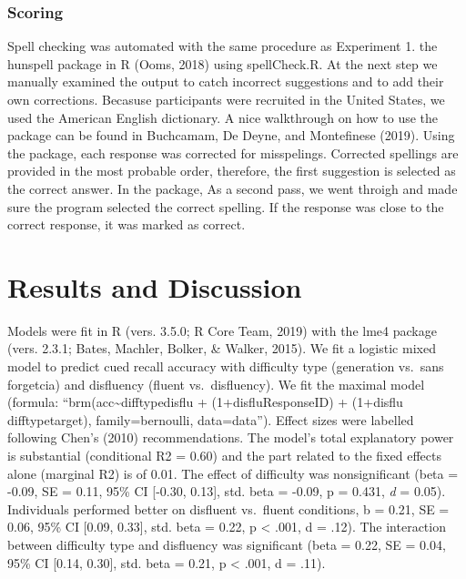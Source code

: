 \documentclass[doc]{apa6}
\begin{document}
\hypertarget{scoring}{%
\subsubsection{Scoring}\label{scoring}}

Spell checking was automated with the same procedure as Experiment 1. the hunspell package in R (Ooms, 2018) using spellCheck.R. At the next step we manually examined the output to catch incorrect suggestions and to add their own corrections. Becasuse participants were recruited in the United States, we used the American English dictionary. A nice walkthrough on how to use the package can be found in Buchcamam, De Deyne, and Montefinese (2019). Using the package, each response was corrected for misspelings. Corrected spellings are provided in the most probable order, therefore, the first suggestion is selected as the correct answer. In the package, As a second pass, we went throigh and made sure the program selected the correct spelling. If the response was close to the correct response, it was marked as correct.

\hypertarget{results-and-discussion}{%
\section{Results and Discussion}\label{results-and-discussion}}

Models were fit in R (vers. 3.5.0; R Core Team, 2019) with the lme4 package (vers. 2.3.1; Bates, Machler, Bolker, \& Walker, 2015). We fit a logistic mixed model to predict cued recall accuracy with difficulty type (generation vs.~sans forgetcia) and disfluency (fluent vs.~disfluency). We fit the maximal model (formula: \enquote{brm(acc\textasciitilde{}difftypedisflu + (1+disflu\textbar{}ResponseID) + (1+disflu difftype\textbar{}target), family=bernoulli, data=data}). Effect sizes were labelled following Chen's (2010) recommendations. The model's total explanatory power is substantial (conditional R2 = 0.60) and the part related to the fixed effects alone (marginal R2) is of 0.01. The effect of difficulty was nonsignificant (beta = -0.09, SE = 0.11, 95\% CI {[}-0.30, 0.13{]}, std. beta = -0.09, p = 0.431, \emph{d} = 0.05). Individuals performed better on disfluent vs.~fluent conditions, b = 0.21, SE = 0.06, 95\% CI {[}0.09, 0.33{]}, std. beta = 0.22, p \textless{} .001, d = .12). The interaction between difficulty type and disfluency was significant (beta = 0.22, SE = 0.04, 95\% CI {[}0.14, 0.30{]}, std. beta = 0.21, p \textless{} .001, d = .11).
\end{document}
